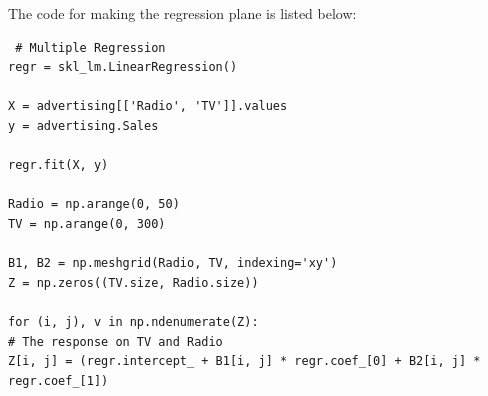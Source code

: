 The code for making the regression plane is listed below:

\begin{lstlisting}
 # Multiple Regression
regr = skl_lm.LinearRegression()

X = advertising[['Radio', 'TV']].values
y = advertising.Sales

regr.fit(X, y)

Radio = np.arange(0, 50)
TV = np.arange(0, 300)

B1, B2 = np.meshgrid(Radio, TV, indexing='xy')
Z = np.zeros((TV.size, Radio.size))

for (i, j), v in np.ndenumerate(Z):
# The response on TV and Radio
Z[i, j] = (regr.intercept_ + B1[i, j] * regr.coef_[0] + B2[i, j] * regr.coef_[1])
\end{lstlisting}


